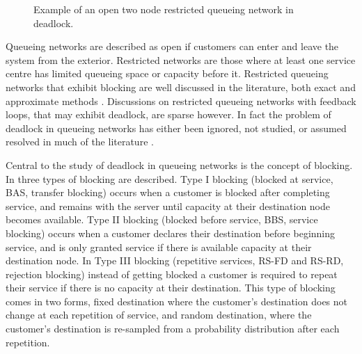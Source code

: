\documentclass{article}
\numberwithin{equation}{section}
\begin{document}
\begin{figure}[!htbp]
  \begin{center}
  
  \end{center}
  \caption{Example of an open two node restricted queueing network in deadlock.}
  \label{fig:1st_example}
\end{figure}

Queueing networks are described as open if customers can enter and leave the system from the exterior.
Restricted networks are those where at least one service centre has limited queueing space or capacity before it.
Restricted queueing networks that exhibit blocking are well discussed in the literature, both exact \cite{hunt56, baber08, aviitzhakyadin65, koizumietal05, latoucheneuts80, perrosetal88, gordonnewell67} and approximate methods \cite{takahashi80, korporaaletal00, onvural90, perrosetal88, dalleryfrein93, allonetal13}. Discussions on restricted queueing networks with feedback loops, that may exhibit deadlock, are sparse however.
In fact the problem of deadlock in queueing networks has either been ignored, not studied, or assumed resolved in much of the literature \cite{onvural90, perrosetal88}.

Central to the study of deadlock in queueing networks is the concept of blocking.
In \cite{onvuralperros86} three types of blocking are described.
Type I blocking (blocked at service, BAS, transfer blocking) occurs when a customer is blocked after completing service, and remains with the server until capacity at their destination node becomes available.
Type II blocking (blocked before service, BBS, service blocking) occurs when a customer declares their destination before beginning service, and is only granted service if there is available capacity at their destination node.
In Type III blocking (repetitive services, RS-FD and RS-RD, rejection blocking) instead of getting blocked a customer is required to repeat their service if there is no capacity at their destination.
This type of blocking comes in two forms, fixed destination where the customer's destination does not change at each repetition of service, and random destination, where the customer's destination is re-sampled from a probability distribution after each repetition.
\end{document}
